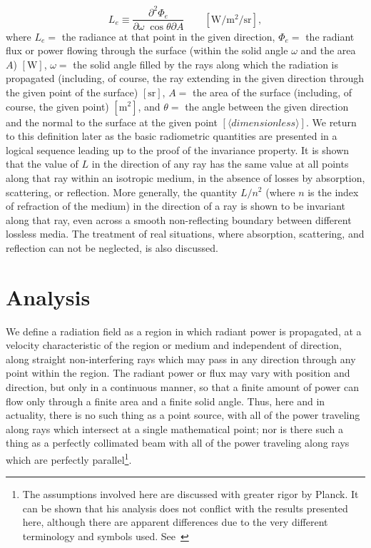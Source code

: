 \begin{equation}\label{eqn:nicodemus1}
L_e \equiv \frac{\partial^2 \Phi_e}{\partial\omega \; \cos\theta\partial A}
\qquad \left[\si{\watt\per\square\meter\per\steradian}\right],
\end{equation}
where $L_e = $ the radiance at that point in the given direction,
$\Phi_e = $ the radiant flux or power flowing through the surface
(within the solid angle $\omega$ and the area $A$) $[\si{\watt}]$,
$\omega = $ the solid angle filled by the rays along which the
radiation is propagated (including, of course, the ray extending
in the given direction through the given point of the surface)
$[\si{\steradian}]$,
$A =$ the area of the surface (including, of course, the given point)
$[\si{\square\meter}]$, and $\theta = $ the angle between the given direction
and the normal to the surface at the given point $[\langle dimensionless
\rangle]$.
We return to this definition later as the basic radiometric quantities are
presented in a logical sequence leading up to the proof of the invariance
property. It is shown that the value of $L$ in the direction of any ray
has the same value at all points along that ray within an isotropic medium,
in the absence of losses by absorption, scattering, or reflection.
More generally, the quantity $L/n^2$ (where $n$ is the index of refraction of
the medium) in the direction of a ray is shown to be invariant along that ray,
even
across a smooth non-reflecting boundary between different lossless media.
The treatment of real situations, where absorption, scattering, and reflection
can not be neglected, is also discussed.

\section{Analysis}

We define a radiation field as a region in which radiant power is propagated,
at a velocity characteristic of the region or medium and independent of
direction,
along straight non-interfering rays which may pass in any direction through
any point within the region. The radiant power or flux may vary with position
and direction, but only in a continuous manner, so that a finite amount of power
can flow only through a finite area and a finite solid angle. Thus, here and in
actuality, there is no such thing as a point source, with all of the power
traveling along rays which intersect at a single mathematical point; nor is
there such a thing as a perfectly collimated beam with all of the power
traveling along rays which are perfectly parallel\footnote{\label{note:nicodemus6}
The assumptions involved here are discussed with greater rigor by Planck. It can
be shown that his analysis does not conflict with the results presented here,
although there are apparent differences due to the very different terminology
and symbols used. See~}.

